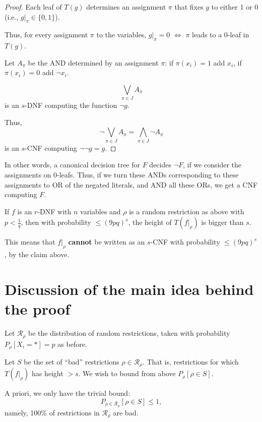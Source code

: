 \begin{proof}
Each leaf of \( T(g) \) determines an assignment \( \pi \) that fixes \( g \) to either 1 or 0 
(i.e., \( g|_{\pi} \in \{0,1\} \)).

Thus, for every assignment \( \pi \) to the variables, \( g|_{\pi} = 0 \) \( \Leftrightarrow \) 
\( \pi \) leads to a 0-leaf in \( T(g) \).

Let \( A_{\pi} \) be the AND determined by an assignment \( \pi \):
if \( \pi(x_i) = 1 \) add \( x_i \), if \( \pi(x_i) = 0 \) add \( \neg x_i \).

\[
\bigvee_{ \pi \in J } A_{\pi}
\]
is an \( s \)-DNF computing the function \( \neg g \).

Thus, 
\[
\neg \bigvee_{\pi \in J} A_{\pi} = \bigwedge_{\pi \in J} \neg A_{\pi}
\]
is an \( s \)-CNF computing \( \neg \neg g = g \).


\end{proof}

In other words, a canonical decision tree for \( F \) decides \( \neg F \),
if we consider the assignments on 0-leafs.
Thus, if we turn these ANDs corresponding to these assignments to OR of the negated literals, and AND all these ORs, 
we get a CNF computing \( F \).


\begin{theorem}
If \( f \) is an \( r \)-DNF with \( n \) variables 
and \( \rho \) is a random restriction as above with 
\( p < \frac{1}{q} \),
then with probability \( \leq (9pq)^s \), the height of \( T(f|_{\rho}) \) 
is bigger than \( s \).
\end{theorem}

This means that \( f|_{\rho} \) \textbf{cannot} be written as an \( s \)-CNF 
with probability \( \leq (9pq)^s \), by the claim above.

\section*{Discussion of the main idea behind the proof}

Let \( \mathcal{R}_{\rho} \) be the distribution of random restrictions, 
taken with probability \( P_{\rho}[X_i = *] = p \) as before.

Let \( S \) be the set of ``bad'' restrictions \( \rho \in \mathcal{R}_{\rho} \).
That is, restrictions for which \( T(f|_{\rho}) \) has height \( > s \).
We wish to bound from above \( P_{\rho}[\rho \in S] \).

A priori, we only have the trivial bound:
\[
P_{\rho \in \mathcal{R}_{\rho}}[\rho \in S] \leq 1,
\]
namely, 100\% of restrictions in \( \mathcal{R}_{\rho} \) are bad.

